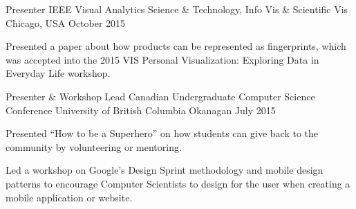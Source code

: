 \begin{cventries}
  \cventry
    {Presenter}
    {IEEE Visual Analytics Science \& Technology, Info Vis \& Scientific Vis}
    {Chicago, USA}
    {October 2015}
    {
      \begin{cvitems}
        \item {Presented a paper about how products can be represented as fingerprints, which was accepted into the 2015 VIS Personal Visualization: Exploring Data in Everyday Life workshop.}
      \end{cvitems}
    }
  \cventry
    {Presenter \& Workshop Lead}
    {Canadian Undergraduate Computer Science Conference}
    {University of British Columbia Okanagan}
    {July 2015}
    {
      \begin{cvitems}
        \item {Presented ``How to be a Superhero'' on how students can give back to the community by volunteering or mentoring.}
        \item {Led a workshop on Google’s Design Sprint methodology and mobile design patterns to encourage Computer Scientists to design for the user when creating a mobile application or website.}
      \end{cvitems}
    }
\end{cventries}
